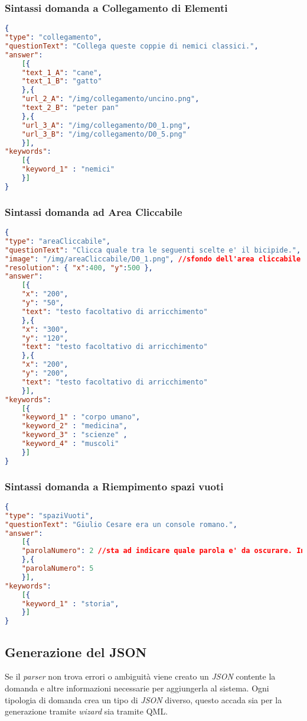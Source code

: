 \subsubsection{Sintassi domanda a Collegamento di Elementi}
\begin{lstlisting}[language=json,firstnumber=1]
{
"type": "collegamento",
"questionText": "Collega queste coppie di nemici classici.",
"answer":
	[{
	"text_1_A": "cane",
	"text_1_B": "gatto"
	},{
	"url_2_A": "/img/collegamento/uncino.png",
	"text_2_B": "peter pan"
	},{
	"url_3_A": "/img/collegamento/D0_1.png",
	"url_3_B": "/img/collegamento/D0_5.png"
	}],
"keywords":
	[{
	"keyword_1" : "nemici"
	}]
}
\end{lstlisting}

\subsubsection{Sintassi domanda ad Area Cliccabile}
\begin{lstlisting}[language=json,firstnumber=1]
{
"type": "areaCliccabile",
"questionText": "Clicca quale tra le seguenti scelte e' il bicipide.",
"image": "/img/areaCliccabile/D0_1.png", //sfondo dell'area cliccabile
"resolution": { "x":400, "y":500 },
"answer":
	[{
	"x": "200",
	"y": "50",
	"text": "testo facoltativo di arricchimento"
	},{
	"x": "300",
	"y": "120",
	"text": "testo facoltativo di arricchimento"
	},{
	"x": "200",
	"y": "200",
	"text": "testo facoltativo di arricchimento"
	}],
"keywords":
	[{
	"keyword_1" : "corpo umano",
	"keyword_2" : "medicina",
	"keyword_3" : "scienze" ,
	"keyword_4" : "muscoli"
	}]
}
\end{lstlisting}

\subsubsection{Sintassi domanda a Riempimento spazi vuoti}
\begin{lstlisting}[language=json,firstnumber=1]
{
"type": "spaziVuoti",
"questionText": "Giulio Cesare era un console romano.",
"answer":
	[{
	"parolaNumero": 2 //sta ad indicare quale parola e' da oscurare. In questo caso la numero 2
	},{
	"parolaNumero": 5
	}],
"keywords":
	[{
	"keyword_1" : "storia",
	}] 
}
\end{lstlisting}

\subsection{Generazione del JSON}
Se il \textit{parser} non trova errori o ambiguità viene creato un \textit{JSON} contente la domanda e altre informazioni necessarie per aggiungerla al sistema. Ogni tipologia di domanda crea un tipo di \textit{JSON} diverso, questo accada sia per la generazione tramite \textit{wizard} sia tramite QML.

